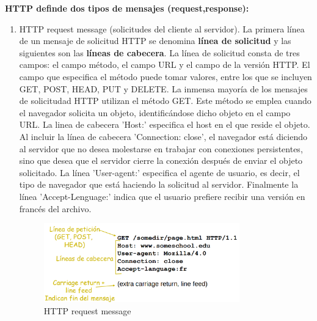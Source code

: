 \documentclass[a4paper,11pt]{article}
\begin{document}
\textbf{HTTP definde dos tipos de mensajes (request,response):}
\begin{enumerate}
\item HTTP request message (solicitudes del cliente al servidor). La primera línea de un mensaje de solicitud HTTP se denomina \textbf{línea de solicitud} y las siguientes son las \textbf{líneas de cabecera}. La línea de solicitud consta de tres campos: el campo método, el campo URL y el campo de la versión HTTP. El campo que especifica el método puede tomar valores, entre los que se incluyen GET, POST, HEAD, PUT y DELETE. La inmensa mayoría de los mensajes de solicitudad HTTP utilizan el método GET. Este método se emplea cuando el navegador solicita un objeto, identificándose dicho objeto en el campo URL. La linea de cabecera 'Host:' especifica el host en el que reside el objeto. Al incluir la línea de cabecera 'Connection: close', el navegador está diciendo al servidor que no desea molestarse en trabajar con conexiones persistentes, sino que desea que el servidor cierre la conexión después de enviar el objeto solicitado. La línea 'User-agent:' especifica el agente de usuario, es decir, el tipo de navegador que está haciendo la solicitud al servidor. Finalmente la línea 'Accept-Lenguage:' indica que el usuario prefiere recibir una versión en francés del archivo.
	\begin{figure}[h]
		\centering
		\caption{HTTP request message}
		\includegraphics[scale=1,width=0.8\textwidth]{mensaje_request.png}
	\end{figure}
	

\end{enumerate}
\end{document}
